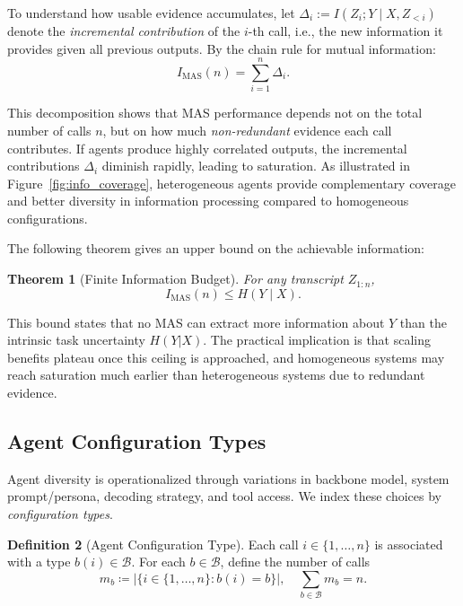 \documentclass{article}
\theoremstyle{plain}
\newtheorem{theorem}{Theorem}[section]
\theoremstyle{definition}
\newtheorem{definition}[theorem]{Definition}
\theoremstyle{remark}
\begin{document}
To understand how usable evidence accumulates, let $\Delta_i := I(Z_i;Y\mid X,Z_{<i})$ denote the \emph{incremental contribution} of the $i$-th call, i.e., the new information it provides given all previous outputs. By the chain rule for mutual information:
\vspace{-0.2cm}
\begin{equation}
I_{\mathrm{MAS}}(n)=\sum_{i=1}^n \Delta_i.
\label{eq:delta_def}
\end{equation}
\vspace{-0.5cm}

This decomposition shows that MAS performance depends not on the total number of calls $n$, but on how much \emph{non-redundant} evidence each call contributes. If agents produce highly correlated outputs, the incremental contributions $\Delta_i$ diminish rapidly, leading to saturation. As illustrated in Figure~\ref{fig:info_coverage}, heterogeneous agents provide complementary coverage and better diversity in information processing compared to homogeneous configurations.

The following theorem gives an upper bound on the achievable information:

\begin{theorem}[Finite Information Budget]
\label{thm:finite_budget}
For any transcript $Z_{1:n}$,
\begin{equation}
I_{\mathrm{MAS}}(n)\le H(Y\mid X).
\label{eq:finite_budget}
\end{equation}
\end{theorem}
\vspace{-0.2cm}
\noindent This bound states that no MAS can extract more information about $Y$ than the intrinsic task uncertainty $H(Y|X)$. The practical implication is that scaling benefits plateau once this ceiling is approached, and homogeneous systems may reach saturation much earlier than heterogeneous systems due to redundant evidence.

\subsection{Agent Configuration Types}
\label{sec:config-types}

Agent diversity is operationalized through variations in backbone model, system prompt/persona, decoding strategy, and tool access.
We index these choices by \emph{configuration types}.

\begin{definition}[Agent Configuration Type]
\label{def:config-type}
Each call $i\in\{1,\ldots,n\}$ is associated with a type $b(i)\in\mathcal{B}$.
For each $b\in\mathcal{B}$, define the number of calls
\begin{equation}
m_b \coloneqq \bigl|\{i\in\{1,\ldots,n\}: b(i)=b\}\bigr|,
\quad \sum_{b\in\mathcal{B}} m_b = n.
\label{eq:mb_def}
\end{equation}

\end{definition}
\end{document}

